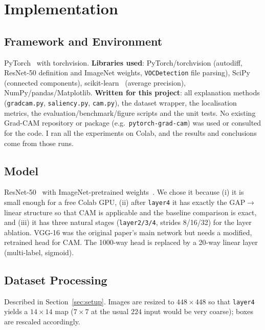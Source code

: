 \documentclass[11pt,a4paper]{article}
\newcommand{\GC}{Grad-CAM}
\begin{document}
\section{Implementation}\label{sec:impl}
\subsection{Framework and Environment}
PyTorch~\citep{paszke2019} with torchvision. \textbf{Libraries used}: PyTorch/torchvision (autodiff, ResNet-50 definition and ImageNet weights, \texttt{VOCDetection} file parsing), SciPy~\citep{virtanen2020} (connected components), scikit-learn~\citep{pedregosa2011} (average precision), NumPy/pandas/Matplotlib. \textbf{Written for this project}: all explanation methods (\texttt{gradcam.py}, \texttt{saliency.py}, \texttt{cam.py}), the dataset wrapper, the localisation metrics, the evaluation/benchmark/figure scripts and the unit tests. No existing \GC{} repository or package (e.g.\ \texttt{pytorch-grad-cam}) was used or consulted for the code. I ran all the experiments on Colab, and the results and conclusions come from those runs.
\subsection{Model}
ResNet-50~\citep{he2016} with ImageNet-pretrained weights~\citep{russakovsky2015}. We chose it because (i) it is small enough for a free Colab GPU, (ii) after \texttt{layer4} it has exactly the GAP$\rightarrow$linear structure so that CAM is applicable and the baseline comparison is exact, and (iii) it has three natural stages (\texttt{layer2/3/4}, strides 8/16/32) for the layer ablation. VGG-16 was the original paper's main network but needs a modified, retrained head for CAM. The 1000-way head is replaced by a 20-way linear layer (multi-label, sigmoid).
\subsection{Dataset Processing}
Described in Section~\ref{sec:setup}. Images are resized to $448\times448$ so that \texttt{layer4} yields a $14\times14$ map ($7\times7$ at the usual $224$ input would be very coarse); boxes are rescaled accordingly.
\end{document}
